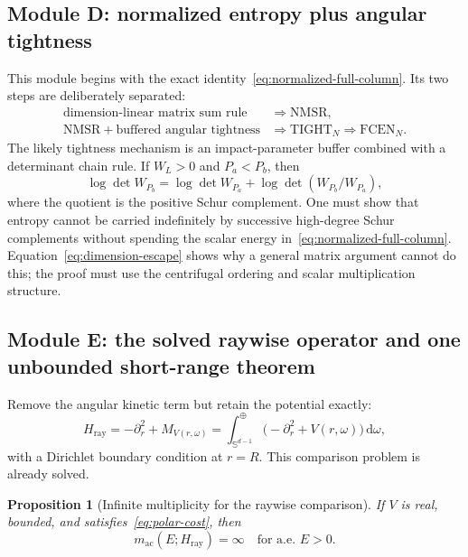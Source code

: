 \documentclass[11pt]{article}
\newcommand{\Sd}{\mathbb S^{d-1}}
\newcommand{\ac}{\mathrm{ac}}
\newcommand{\dd}{\,\mathrm d}
\newtheorem{proposition}[theorem]{Proposition}
\theoremstyle{definition}
\theoremstyle{remark}
\begin{document}
\subsection{Module D: normalized entropy plus angular tightness}

This module begins with the exact identity~\eqref{eq:normalized-full-column}.  Its two steps are deliberately separated:
\begin{align}
 \text{dimension-linear matrix sum rule}
 &\Longrightarrow \mathrm{NMSR},
 \label{eq:norm-route-1}\\
 \mathrm{NMSR}+\text{buffered angular tightness}
 &\Longrightarrow \mathrm{TIGHT}_N
 \Longrightarrow \mathrm{FCEN}_N.
 \label{eq:norm-route-2}
\end{align}
The likely tightness mechanism is an impact-parameter buffer combined with a determinant chain rule.  If $W_L>0$ and $P_a<P_b$, then
\begin{equation}
 \log\det W_{P_b}
 =\log\det W_{P_a}
 +\log\det\!\left(W_{P_b}/W_{P_a}\right),
 \label{eq:schur-chain}
\end{equation}
where the quotient is the positive Schur complement.  One must show that entropy cannot be carried indefinitely by successive high-degree Schur complements without spending the scalar energy in~\eqref{eq:normalized-full-column}.  Equation~\eqref{eq:dimension-escape} shows why a general matrix argument cannot do this; the proof must use the centrifugal ordering and scalar multiplication structure.

\subsection{Module E: the solved raywise operator and one unbounded short-range theorem}

Remove the angular kinetic term but retain the potential exactly:
\begin{equation}
 H_{\mathrm{ray}}
 =-\partial_r^2+M_{V(r,\omega)}
 =\int_{\Sd}^{\oplus}
   \bigl(-\partial_r^2+V(r,\omega)\bigr)\dd\omega,
 \label{eq:H-ray}
\end{equation}
with a Dirichlet boundary condition at $r=R$.  This comparison problem is already solved.

\begin{proposition}[Infinite multiplicity for the raywise comparison]\label{prop:raywise}
If $V$ is real, bounded, and satisfies~\eqref{eq:polar-cost}, then
\begin{equation}
 m_{\ac}(E;H_{\mathrm{ray}})=\infty
 \quad\text{for a.e. }E>0.
 \label{eq:raywise-ac}
\end{equation}
\end{proposition}
\end{document}

